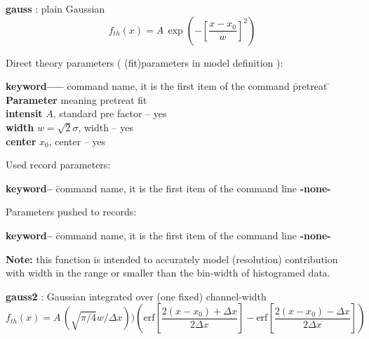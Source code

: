 \documentclass[11pt,fleqn]{book} %
\newcommand{\linespace}{\vspace{4ex}}
\newcommand{\expl}[1]{\hskip 0.5cm {\color{explgray} #1}}
\begin{document}
\begin{exercise}
\textbf{gauss} : \expl{plain Gaussian}\\
\begin{equation}
f_{th}(x) = A \, \exp \left (
- \left [ \frac{x-x_0}{w}
 \right ]^2
 \right )
\end{equation}
\end{exercise}

\linespace


Direct theory parameters ( (fit)parameters in model definition ):
\begin{tabbing}
\textbf{keyword-----}  \= command name, it is the first item of the command \= pretreat   \=   \kill
\textbf{Parameter}  \> meaning                                           \> pretreat   \> fit      \\
\textbf{intensit  } \>  $A$, standard pre factor                          \>  --        \> yes      \\         
\textbf{width     } \>  $w = \sqrt{2} \sigma$, width                     \> --        \> yes      \\
\textbf{center    } \>  $x_0$, center                                    \> --        \> yes       \\
\end{tabbing}

\linespace
Used record parameters: 
\begin{tabbing}
\textbf{keyword--}  \= command name, it is the first item of the command line                    \kill
\textbf{-none-   } \>            \\         
\end{tabbing}

\linespace
Parameters pushed to records:
\begin{tabbing}
\textbf{keyword--}  \= command name, it is the first item of the command line                    \kill
\textbf{-none-  } \>            \\         
\end{tabbing}

\linespace
{\bf Note:} this function is intended to accurately model (resolution) contribution with
width in the range or smaller than the bin-width of histogramed data.


\begin{exercise}
\textbf{gauss2} : \expl{Gaussian integrated over (one fixed) channel-width}\\
\begin{equation}
f_{th}(x) = A \, 
(\sqrt{\pi/4} w/\Delta x)) 
\left (\mathrm{erf} \left [\frac{2(x-x_0)+\Delta x}{2 \Delta x} \right ]-
\mathrm{erf} \left [\frac{2 (x-x_0)-\Delta x}{2 \Delta x
} \right ] \right )
\end{equation}
\end{exercise}
\end{document}
